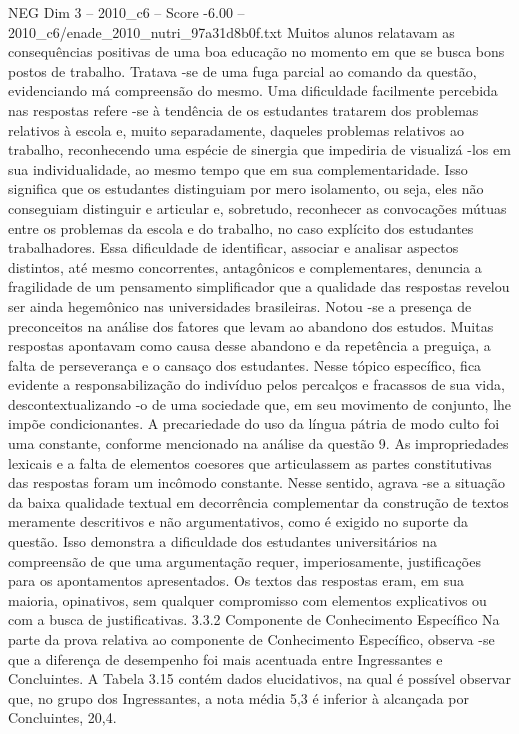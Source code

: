 \begin{textsample}{NEG Dim 3 – 2010\_c6 – Score -6.00 – 2010\_c6/enade\_2010\_nutri\_97a31d8b0f.txt}
Muitos alunos relatavam as consequências positivas de uma boa educação no momento em que se busca bons postos de trabalho.
Tratava -se de uma fuga parcial ao comando da questão, evidenciando má compreensão do mesmo.
Uma dificuldade facilmente percebida nas respostas refere -se à tendência de os estudantes tratarem dos problemas relativos à escola e, muito separadamente, daqueles problemas relativos ao trabalho, reconhecendo uma espécie de sinergia que impediria de visualizá -los em sua individualidade, ao mesmo tempo que em sua complementaridade.
Isso significa que os estudantes distinguiam por mero isolamento, ou seja, eles não conseguiam distinguir e articular e, sobretudo, reconhecer as convocações mútuas entre os problemas da escola e do trabalho, no caso explícito dos estudantes trabalhadores.
Essa dificuldade de identificar, associar e analisar aspectos distintos, até mesmo concorrentes, antagônicos e complementares, denuncia a fragilidade de um pensamento simplificador que a qualidade das respostas revelou ser ainda hegemônico nas universidades brasileiras.
Notou -se a presença de preconceitos na análise dos fatores que levam ao abandono dos estudos.
Muitas respostas apontavam como causa desse abandono e da repetência a preguiça, a falta de perseverança e o cansaço dos estudantes.
Nesse tópico específico, fica evidente a responsabilização do indivíduo pelos percalços e fracassos de sua vida, descontextualizando -o de uma sociedade que, em seu movimento de conjunto, lhe impõe condicionantes.
A precariedade do uso da língua pátria de modo culto foi uma constante, conforme mencionado na análise da questão 9.
As impropriedades lexicais e a falta de elementos coesores que articulassem as partes constitutivas das respostas foram um incômodo constante.
Nesse sentido, agrava -se a situação da baixa qualidade textual em decorrência complementar da construção de textos meramente descritivos e não argumentativos, como é exigido no suporte da questão.
Isso demonstra a dificuldade dos estudantes universitários na compreensão de que uma argumentação requer, imperiosamente, justificações para os apontamentos apresentados.
Os textos das respostas eram, em sua maioria, opinativos, sem qualquer compromisso com elementos explicativos ou com a busca de justificativas. 3.3.2 Componente de Conhecimento Específico Na parte da prova relativa ao componente de Conhecimento Específico, observa -se que a diferença de desempenho foi mais acentuada entre Ingressantes e Concluintes.
A Tabela 3.15 contém dados elucidativos, na qual é possível observar que, no grupo dos Ingressantes, a nota média 5,3 é inferior à alcançada por Concluintes, 20,4.

\end{textsample}
